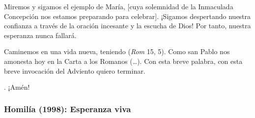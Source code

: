 \begin{body}
	Miremos y sigamos el ejemplo de María, {[}cuya solemnidad de la Inmaculada Concepción nos estamos preparando para celebrar{]}. ¡Sigamos despertando nuestra confianza a través de la oración incesante y la escucha de Dios! Por tanto, nuestra esperanza nunca fallará. 
	
	Caminemos en una vida nueva, teniendo  (\emph{Rom} 15, 5). Como san Pablo nos amonesta hoy en la Carta a los Romanos (\ldots{}). Con esta breve palabra, con esta breve invocación del Adviento quiero terminar. 
	
	. ¡Amén!
\end{body}

\subsubsection{Homilía (1998): Esperanza viva}


